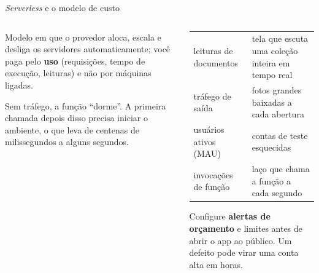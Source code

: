 \documentclass[aspectratio=169,10pt]{beamer}
\begin{document}
\begin{frame}{\emph{Serverless} e o modelo de custo}
  \begin{columns}[T]
    \begin{column}{0.5\textwidth}
      \begin{definicao}
        Modelo em que o provedor aloca, escala e desliga os servidores automaticamente; você paga pelo \textbf{uso} (requisições, tempo de execução, leituras) e não por máquinas ligadas.
      \end{definicao}
      \begin{pordentro}
        Sem tráfego, a função ``dorme''. A primeira chamada depois disso precisa iniciar o ambiente, o que leva de centenas de milissegundos a alguns segundos.
      \end{pordentro}
    \end{column}
    \begin{column}{0.48\textwidth}
      \scriptsize
      \begin{tabularx}{\linewidth}{@{}l L@{}}
        \toprule
         &  \\
        \midrule
        leituras de documentos & tela que escuta uma coleção inteira em tempo real \\
        tráfego de saída & fotos grandes baixadas a cada abertura \\
        usuários ativos (MAU) & contas de teste esquecidas \\
        invocações de função & laço que chama a função a cada segundo \\
        \bottomrule
      \end{tabularx}
      \begin{atencao}
        Configure \textbf{alertas de orçamento} e limites antes de abrir o app ao público. Um defeito pode virar uma conta alta em horas.
      \end{atencao}
    \end{column}
  \end{columns}
\end{frame}
\end{document}
